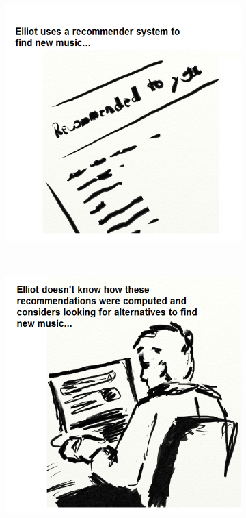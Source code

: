 \begin{figure}
	\centering
	\begin{subfigure}[t]{0.4\textwidth}
					\centering
					\includegraphics[width=\textwidth]{img/storyboard01}
					\caption{}
					\label{figure:storyboard01}
	\end{subfigure}%
	~
	\begin{subfigure}[t]{0.4\textwidth}
					\centering
					\includegraphics[width=\textwidth]{img/storyboard02}

\end{subfigure}
\end{figure}
